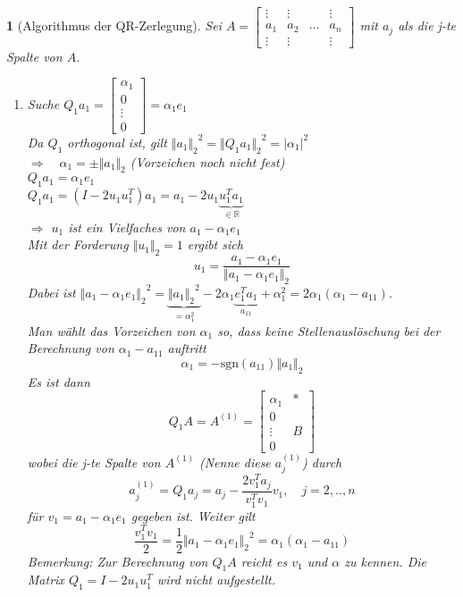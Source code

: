 \documentclass[12pt]{article}
\theoremstyle{break}
\newtheorem{nothing}[theorem]{}
\begin{document}
\begin{nothing}[Algorithmus der QR-Zerlegung]
Sei $A = \left[ \begin{matrix} \vdots & \vdots & & \vdots \\ a_1 & a_2 & \dots & a_n \\ \vdots & \vdots & & \vdots \end{matrix} \right]$ mit $a_j$ als die j-te Spalte von $A$.
\renewcommand{\labelenumi}{\theenumi) }
\begin{enumerate}
  \item Suche $Q_1a_1 = \left[ \begin{matrix} \alpha_1 \\ 0 \\ \vdots \\ 0 \end{matrix} \right] = \alpha_1 e_1$\\
  Da $Q_1$ orthogonal ist, gilt ${\Vert a_1 \Vert_2}^2 = {\Vert Q_1a_1 \Vert_2}^2 = \vert \alpha_1 \vert ^2$\\
  $\Rightarrow \quad \alpha_1 = \pm {\Vert a_1 \Vert _2}$ (Vorzeichen noch nicht fest)\\
  $Q_1a_1 = \alpha_1e_1$ \\
  $Q_1a_1 = (I-2u_1u_1^T)a_1 = a_1 - 2u_1 \underbrace{u_1^Ta_1}_{\in \mathbb{R}}$\\
  $\Rightarrow$ $u_1$ ist ein Vielfaches von $a_1 - \alpha_1 e_1$\\
  Mit der Forderung $\Vert u_1 \Vert_2 = 1 $ ergibt sich
  $$u_1 = \frac{a_1 - \alpha_1e_1}{\Vert a_1 - \alpha_1e_1 \Vert_2}$$
  Dabei ist ${\Vert a_1 - \alpha_1e_1 \Vert_2}^2 = \underbrace{{\Vert a_1 \Vert_2}^2}_{=\alpha_1^2} - 2 \alpha_1 \underbrace{e_1^Ta_1}_{a_{11}} + \alpha_1^2 = 2 \alpha_1 ( \alpha_1 - a_{11})$.\\
  Man wählt das Vorzeichen von $\alpha_1$ so, dass keine Stellenauslöschung bei der Berechnung von $\alpha_1 - a_{11}$ auftritt
  $$\alpha_1 = -\text{sgn}(a_{11}) \Vert a_1 \Vert_2$$
  Es ist dann 
  $$Q_1A= A^{(1)} = \left[ \begin{array}{c|c} \alpha_1 & * \\ \hline 0 \\ \vdots & B \\ 0 \end{array} \right]$$
  wobei die j-te Spalte von $A^{(1)}$ (Nenne diese $a_j^{(1)}$) durch
  $$a_j^{(1)} = Q_1a_j = a_j - \frac{2 v_1^Ta_j}{v_1^Tv_1} v_1, \quad j = 2,..,n$$
  für $v_1 = a_1 - \alpha_1e_1$ gegeben ist. Weiter gilt
  $$ \frac{v_1^Tv_1}{2} = \frac{1}{2} {\Vert a_1 - \alpha_1 e_1 \Vert_2}^2 = \alpha_1(\alpha_1 - a_{11})$$
  Bemerkung: Zur Berechnung von $Q_1A$ reicht es $v_1$ und $\alpha$ zu kennen. Die Matrix $Q_1 = I-2u_1u_1^T$ wird nicht aufgestellt.
  

\end{enumerate}
\end{nothing}
\end{document}
